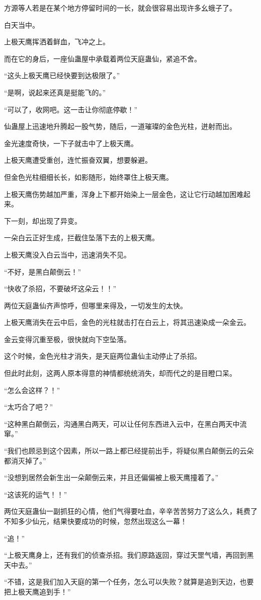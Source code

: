 \begin{this_body}
方源等人若是在某个地方停留时间的一长，就会很容易出现许多幺蛾子了。

白天当中。

上极天鹰挥洒着鲜血，飞冲之上。

而在它的身后，一座仙蛊屋中承载着两位天庭蛊仙，紧追不舍。

“这头上极天鹰已经快要到达极限了。”

“是啊，说起来还真是挺能飞的。”

“可以了，收网吧。这一击让你彻底停歇！”

仙蛊屋上迅速地升腾起一股气势，随后，一道璀璨的金色光柱，迸射而出。

金光速度奇快，一下子就击中了上极天鹰。

上极天鹰遭受重创，连忙振奋双翼，想要躲避。

但金色光柱细细长长，如影随形，始终罩住上极天鹰。

上极天鹰伤势越加严重，浑身上下都开始染上一层金色，这让它行动越加困难起来。

下一刻，却出现了异变。

一朵白云正好生成，拦截住坠落下去的上极天鹰。

上极天鹰没入白云当中，迅速消失不见。

“不好，是黑白颠倒云！”

“快收了杀招，不要破坏这朵云！！”

两位天庭蛊仙齐声惊呼，但哪里来得及，一切发生的太快。

上极天鹰消失在云中后，金色的光柱就击打在白云上，将其迅速染成一朵金云。

金云变得沉重至极，很快就向下空坠落。

这个时候，金色光柱才消失，是天庭两位蛊仙主动停止了杀招。

但此时此刻，这两人原本得意的神情都统统消失，却而代之的是目瞪口呆。

“怎么会这样？！”

“太巧合了吧？”

“这种黑白颠倒云，沟通黑白两天，可以让任何东西进入云中，在黑白两天中流窜。”

“我们也顾忌到这个因素，所以一路上都已经提前出手，将疑似黑白颠倒云的云朵都消灭掉了。”

“没想到居然会新生出一朵颠倒云来，并且还偏偏被上极天鹰撞着了。”

“这该死的运气！！”

两位天庭蛊仙一副抓狂的心情，他们气得要吐血，辛辛苦苦努力了这么久，耗费了不知多少仙元，结果快要成功的时候，忽然出现这么一幕！

“追！”

“上极天鹰身上，还有我们的侦查杀招。我们原路返回，穿过天罡气墙，再回到黑天中去。”

“不错，这是我们加入天庭的第一个任务，怎么可以失败？就算是追到天边，也要把上极天鹰追到手！”

\end{this_body}

